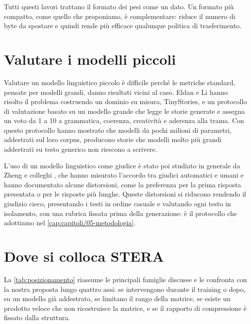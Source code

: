 Tutti questi lavori trattano il formato dei pesi come un dato. Un formato più compatto, come quello che proponiamo, è complementare: riduce il numero di byte da spostare e quindi rende più efficace qualunque politica di trasferimento.

\section{Valutare i modelli piccoli}

Valutare un modello linguistico piccolo è difficile perché le metriche standard, pensate per modelli grandi, danno risultati vicini al caso. Eldan e Li \cite{eldan2023tinystories} hanno risolto il problema costruendo un dominio su misura, TinyStories, e un protocollo di valutazione basato su un modello grande che legge le storie generate e assegna un voto da 1 a 10 a grammatica, coerenza, creatività e aderenza alla trama. Con questo protocollo hanno mostrato che modelli da pochi milioni di parametri, addestrati sul loro corpus, producono storie che modelli molto più grandi addestrati su testo generico non riescono a scrivere.

L'uso di un modello linguistico come giudice è stato poi studiato in generale da Zheng e colleghi \cite{zheng2023judging}, che hanno misurato l'accordo tra giudici automatici e umani e hanno documentato alcune distorsioni, come la preferenza per la prima risposta presentata o per le risposte più lunghe. Queste distorsioni si riducono rendendo il giudizio cieco, presentando i testi in ordine casuale e valutando ogni testo in isolamento, con una rubrica fissata prima della generazione: è il protocollo che adottiamo nel \autoref{cap:capitoli/05-metodologia}.

\section{Dove si colloca STERA}

La \autoref{tab:posizionamento} riassume le principali famiglie discusse e le confronta con la nostra proposta lungo quattro assi: se intervengono durante il training o dopo, su un modello già addestrato, se limitano il rango della matrice, se esiste un prodotto veloce che non ricostruisce la matrice, e se il rapporto di compressione è fissato dalla struttura.

